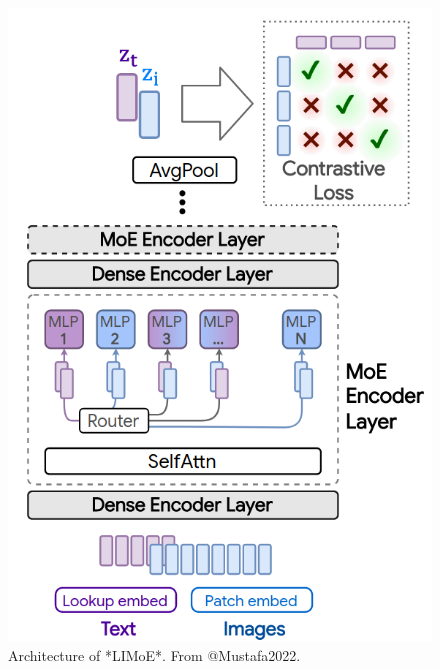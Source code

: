 \documentclass[
]{krantz}
\begin{document}
\begin{figure}

{\centering \includegraphics[width=0.8\linewidth]{figures/03-03-multipurpose/LIMoE} 

}

\caption{Architecture of *LIMoE*. From @Mustafa2022.}\label{fig:LIMoE}
\end{figure}
\end{document}
